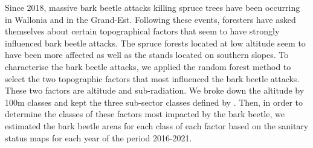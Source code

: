 \documentclass[3p,procedia]{elsarticle}
\begin{document}









Since 2018, massive bark beetle attacks killing spruce trees have been occurring in Wallonia and in the Grand-Est. Following these events, foresters have asked themselves about certain topographical factors that seem to have strongly influenced bark beetle attacks. 
The spruce forests located at low altitude seem to have been more affected as well as the stands located on southern slopes.
To characterise the bark beetle attacks, we applied the random forest method to select the two topographic factors that most influenced the bark beetle attacks. These two factors are altitude and sub-radiation. We broke down the altitude by 100m classes and kept the three sub-sector classes defined by \cite{Delvaux_galoux}.
Then, in order to determine the classes of these factors most impacted by the bark beetle, we estimated the bark beetle areas for each class of each factor based on the sanitary status maps for each year of the period 2016-2021.
\end{document}
